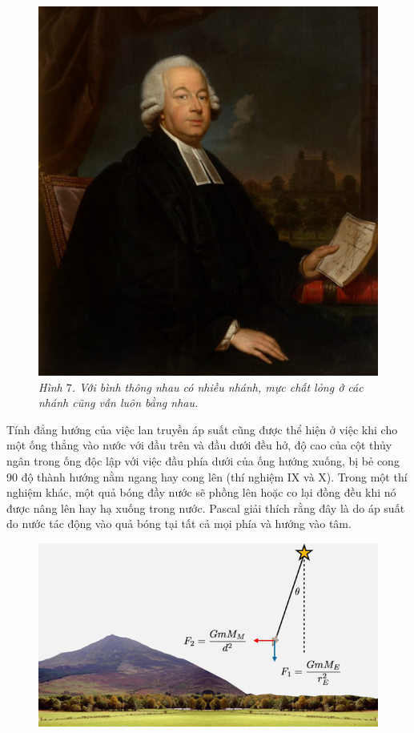 \begin{multicols}{2}
\begin{figure}[H]
		\includegraphics[width= 1\linewidth]{9}
		\caption{\small\textit{\color{timhieukhoahoc}Hình $7$. Với bình thông nhau có nhiều nhánh, mực chất lỏng ở các nhánh cũng vẫn luôn bằng nhau.}}
		\vspace*{-10pt}
	\end{figure}
	Tính đẳng hướng của việc lan truyền áp suất cũng được thể hiện ở việc khi cho một ống thẳng vào nước với đầu trên và đầu dưới đều hở, độ cao của cột thủy ngân trong ống độc lập với việc đầu phía dưới của ống hướng xuống, bị bẻ cong 90 độ thành hướng nằm ngang hay cong lên (thí nghiệm IX và X). Trong một thí nghiệm khác, một quả bóng đầy nước sẽ phồng lên hoặc co lại đồng đều khi nó được nâng lên hay hạ xuống trong nước. Pascal giải thích rằng đây là do áp suất do nước tác động vào quả bóng tại tất cả mọi phía và hướng vào tâm.
	\begin{figure}[H]
		\vspace*{-5pt}
		\centering
		\captionsetup{labelformat= empty, justification=centering}
		\includegraphics[width= 1\linewidth]{10}

\end{figure}
\end{multicols}

